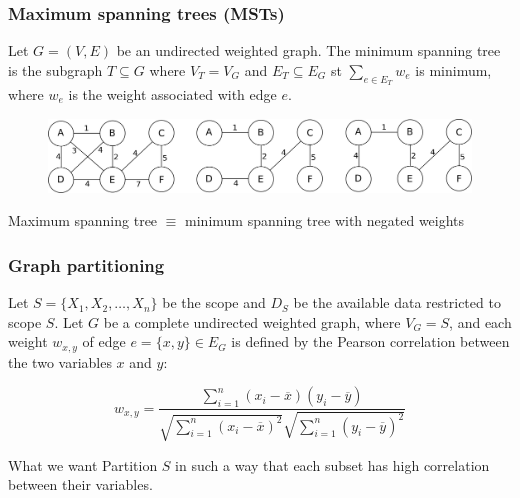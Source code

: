 \documentclass[usenames,dvipsnames]{beamer}
\begin{document}
\begin{frame}
  \frametitle{Maximum spanning trees (MSTs)}

  \begin{definition}
    Let $G=(V,E)$ be an undirected weighted graph. The minimum spanning tree is the subgraph
    $T\subseteq G$ where $V_T=V_G$ and $E_T\subseteq E_G$ st $\sum_{e\in E_T} w_e$ is minimum,
    where $w_e$ is the weight associated with edge $e$.
  \end{definition}
  \vspace{0.25cm}

  \begin{figure}
    \centering\includegraphics[width=\textwidth]{imgs/mst.png}
  \end{figure}

  \vspace{0.25cm}
  \small Maximum spanning tree $\equiv$ minimum spanning tree with negated weights
\end{frame}

\begin{frame}
  \frametitle{Graph partitioning}

  Let $S=\{X_1,X_2,\ldots,X_n\}$ be the scope and $D_S$ be the available data restricted to scope
  $S$. Let $G$ be a complete undirected weighted graph, where $V_G=S$, and each weight $w_{x,y}$ of
  edge $e=\{x,y\}\in E_G$ is defined by the Pearson correlation between the two variables $x$ and
  $y$:
  \vspace{0.125cm}

  \begin{equation*}
    w_{x,y} = \frac{\sum_{i=1}^n (x_i-\overline{x})(y_i-\overline{y})}{\sqrt{\sum_{i=1}^n (x_i-
    \overline{x})^2}\sqrt{\sum_{i=1}^n (y_i-\overline{y})^2}}
  \end{equation*}
  \vspace{0.125cm}

  \begin{block}{What we want}
    Partition $S$ in such a way that each subset has high correlation between their variables.
  \end{block}
\end{frame}
\end{document}
